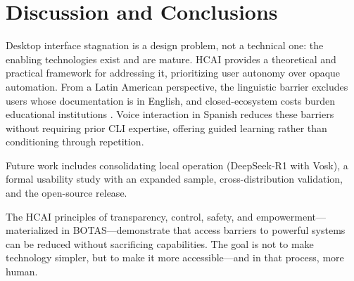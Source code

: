 \documentclass[12pt]{article}
\begin{document}
\section{Discussion and Conclusions}
\label{sec:discussion}

Desktop interface stagnation is a design problem, not a technical one: the
enabling technologies exist and are mature. HCAI provides a theoretical and
practical framework for addressing it, prioritizing user autonomy over opaque
automation. From a Latin American perspective, the linguistic barrier excludes
users whose documentation is in English, and closed-ecosystem costs burden
educational institutions \cite{Warschauer2004}. Voice interaction in Spanish
reduces these barriers without requiring prior CLI expertise, offering guided
learning rather than conditioning through repetition.

Future work includes consolidating local operation (DeepSeek-R1 with Vosk),
a formal usability study with an expanded sample, cross-distribution validation,
and the open-source release.

The HCAI principles of transparency, control, safety, and
empowerment---materialized in BOTAS---demonstrate that access barriers to
powerful systems can be reduced without sacrificing capabilities. The goal is
not to make technology simpler, but to make it more accessible---and in that
process, more human.




\end{document}
